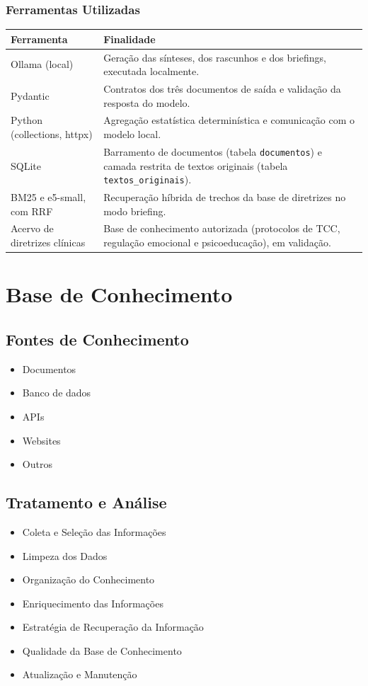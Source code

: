 \documentclass[12pt,a4paper]{article}
\newcommand{\cab}[1]{\textbf{#1}}
\begin{document}
\subsubsection{Ferramentas Utilizadas}
\begin{tabularx}{\textwidth}{|p{5cm}|Y|}
  \hline
  \cab{Ferramenta} & \cab{Finalidade} \\ \hline
  Ollama (local) & Geração das sínteses, dos rascunhos e dos briefings, executada localmente. \\ \hline
  Pydantic & Contratos dos três documentos de saída e validação da resposta do modelo. \\ \hline
  Python (collections, httpx) & Agregação estatística determinística e comunicação com o modelo local. \\ \hline
  SQLite & Barramento de documentos (tabela \texttt{documentos}) e camada restrita de textos originais (tabela \texttt{textos\_originais}). \\ \hline
  BM25 e e5-small, com RRF & Recuperação híbrida de trechos da base de diretrizes no modo briefing. \\ \hline
  Acervo de diretrizes clínicas & Base de conhecimento autorizada (protocolos de TCC, regulação emocional e psicoeducação), em validação. \\ \hline
\end{tabularx}

\section{Base de Conhecimento}

\subsection{Fontes de Conhecimento}
\begin{itemize}
  \item Documentos
  \item Banco de dados
  \item APIs
  \item Websites
  \item Outros
\end{itemize}

\subsection{Tratamento e Análise}
\begin{itemize}
  \item Coleta e Seleção das Informações
  \item Limpeza dos Dados
  \item Organização do Conhecimento
  \item Enriquecimento das Informações
  \item Estratégia de Recuperação da Informação
  \item Qualidade da Base de Conhecimento
  \item Atualização e Manutenção
\end{itemize}
\end{document}
